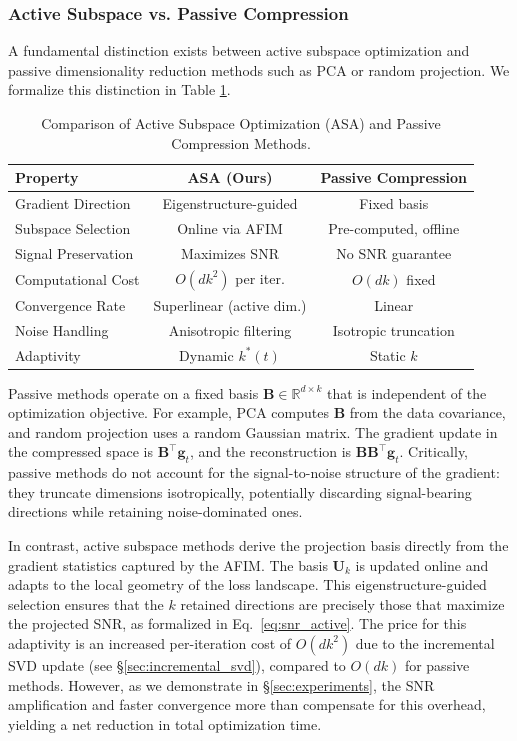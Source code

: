 \documentclass[preprint,12pt]{elsarticle}
\begin{document}
\subsubsection{Active Subspace vs. Passive Compression}

A fundamental distinction exists between active subspace optimization and passive dimensionality reduction methods such as PCA or random projection. We formalize this distinction in Table \ref{tab:comparison}.

\begin{table}[t]
\centering
\caption{Comparison of Active Subspace Optimization (ASA) and Passive Compression Methods.}
\label{tab:comparison}
\begin{tabular}{lcc}
\toprule
\textbf{Property} & \textbf{ASA (Ours)} & \textbf{Passive Compression} \\
\midrule
Gradient Direction & Eigenstructure-guided & Fixed basis \\
Subspace Selection & Online via AFIM & Pre-computed, offline \\
Signal Preservation & Maximizes SNR & No SNR guarantee \\
Computational Cost & $O(dk^2)$ per iter. & $O(dk)$ fixed \\
Convergence Rate & Superlinear (active dim.) & Linear \\
Noise Handling & Anisotropic filtering & Isotropic truncation \\
Adaptivity & Dynamic $k^*(t)$ & Static $k$ \\
\bottomrule
\end{tabular}
\end{table}

Passive methods operate on a fixed basis $\mathbf{B} \in \mathbb{R}^{d \times k}$ that is independent of the optimization objective. For example, PCA computes $\mathbf{B}$ from the data covariance, and random projection uses a random Gaussian matrix. The gradient update in the compressed space is $\mathbf{B}^\top \mathbf{g}_t$, and the reconstruction is $\mathbf{B} \mathbf{B}^\top \mathbf{g}_t$. Critically, passive methods do not account for the signal-to-noise structure of the gradient: they truncate dimensions isotropically, potentially discarding signal-bearing directions while retaining noise-dominated ones.

In contrast, active subspace methods derive the projection basis directly from the gradient statistics captured by the AFIM. The basis $\mathbf{U}_k$ is updated online and adapts to the local geometry of the loss landscape. This eigenstructure-guided selection ensures that the $k$ retained directions are precisely those that maximize the projected SNR, as formalized in Eq.~\eqref{eq:snr_active}. The price for this adaptivity is an increased per-iteration cost of $O(dk^2)$ due to the incremental SVD update (see \S\ref{sec:incremental_svd}), compared to $O(dk)$ for passive methods. However, as we demonstrate in \S\ref{sec:experiments}, the SNR amplification and faster convergence more than compensate for this overhead, yielding a net reduction in total optimization time.
\end{document}
